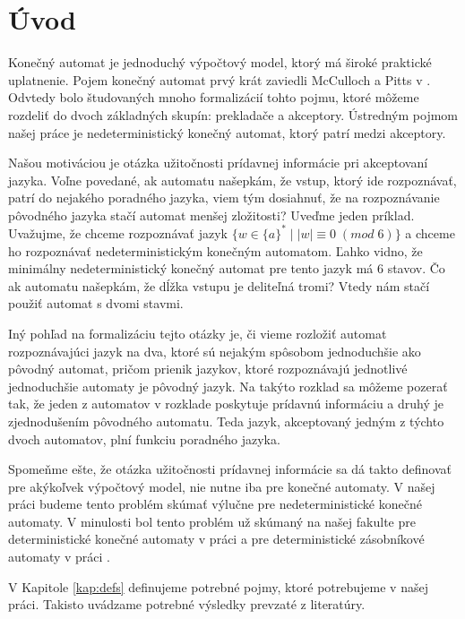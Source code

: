 \chapter*{Úvod}

Konečný automat je jednoduchý výpočtový model, ktorý má široké praktické uplatnenie. Pojem konečný automat prvý krát zaviedli McCulloch a Pitts v \cite{McCullochPitts}. Odvtedy bolo študovaných mnoho formalizácií tohto pojmu, ktoré môžeme rozdeliť do dvoch základných skupín: prekladače a akceptory. Ústredným pojmom našej práce je nedeterministický konečný automat, ktorý patrí medzi akceptory.
\par
Našou motiváciou je otázka užitočnosti prídavnej informácie pri akceptovaní jazyka. Voľne povedané, ak automatu našepkám, že vstup, ktorý ide rozpoznávať, patrí do nejakého poradného jazyka, viem tým dosiahnuť, že na rozpoznávanie pôvodného jazyka stačí automat menšej zložitosti? Uveďme jeden príklad. Uvažujme, že chceme rozpoznávať jazyk $ \lbrace w \in \lbrace a \rbrace^* \; | \; |w| \equiv 0 \; (mod \; 6) \rbrace $ a chceme ho rozpoznávať nedeterministickým konečným automatom. Ľahko vidno, že minimálny nedeterministický konečný automat pre tento jazyk má 6 stavov. Čo ak automatu našepkám, že dĺžka vstupu je deliteľná tromi? Vtedy nám stačí použiť automat s dvomi stavmi.
\par
Iný pohľad na formalizáciu tejto otázky je, či vieme rozložiť automat rozpoznávajúci jazyk na dva, ktoré sú nejakým spôsobom jednoduchšie ako pôvodný automat, pričom prienik jazykov, ktoré rozpoznávajú jednotlivé jednoduchšie automaty je pôvodný jazyk. Na takýto rozklad sa môžeme pozerať tak, že jeden z automatov v rozklade poskytuje prídavnú informáciu a druhý je zjednodušením pôvodného automatu. Teda jazyk, akceptovaný jedným z týchto dvoch automatov, plní funkciu poradného jazyka.
\par
Spomeňme ešte, že otázka užitočnosti prídavnej informácie sa dá takto definovať pre akýkoľvek výpočtový model, nie nutne iba pre konečné automaty. V našej práci budeme tento problém skúmať výlučne pre nedeterministické konečné automaty. V minulosti bol tento problém už skúmaný na našej fakulte pre deterministické konečné automaty v práci \cite{Gazi} a pre deterministické zásobníkové automaty v práci \cite{Labath}.
\par
V Kapitole \ref{kap:defs} definujeme potrebné pojmy, ktoré potrebujeme v našej práci. Takisto uvádzame potrebné výsledky prevzaté z literatúry.
\par
